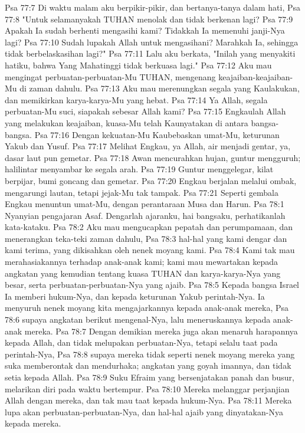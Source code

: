 Psa 77:7  Di waktu malam aku berpikir-pikir, dan bertanya-tanya dalam hati,
Psa 77:8  "Untuk selamanyakah TUHAN menolak dan tidak berkenan lagi?
Psa 77:9  Apakah Ia sudah berhenti mengasihi kami? Tidakkah Ia memenuhi janji-Nya lagi?
Psa 77:10  Sudah lupakah Allah untuk mengasihani? Marahkah Ia, sehingga tidak berbelaskasihan lagi?"
Psa 77:11  Lalu aku berkata, "Inilah yang menyakiti hatiku, bahwa Yang Mahatinggi tidak berkuasa lagi."
Psa 77:12  Aku mau mengingat perbuatan-perbuatan-Mu TUHAN, mengenang keajaiban-keajaiban-Mu di zaman dahulu.
Psa 77:13  Aku mau merenungkan segala yang Kaulakukan, dan memikirkan karya-karya-Mu yang hebat.
Psa 77:14  Ya Allah, segala perbuatan-Mu suci, siapakah sebesar Allah kami?
Psa 77:15  Engkaulah Allah yang melakukan keajaiban, kuasa-Mu telah Kaunyatakan di antara bangsa-bangsa.
Psa 77:16  Dengan kekuatan-Mu Kaubebaskan umat-Mu, keturunan Yakub dan Yusuf.
Psa 77:17  Melihat Engkau, ya Allah, air menjadi gentar, ya, dasar laut pun gemetar.
Psa 77:18  Awan mencurahkan hujan, guntur mengguruh; halilintar menyambar ke segala arah.
Psa 77:19  Guntur menggelegar, kilat berpijar, bumi goncang dan gemetar.
Psa 77:20  Engkau berjalan melalui ombak, mengarungi lautan, tetapi jejak-Mu tak tampak.
Psa 77:21  Seperti gembala Engkau menuntun umat-Mu, dengan perantaraan Musa dan Harun.
Psa 78:1  Nyanyian pengajaran Asaf. Dengarlah ajaranku, hai bangsaku, perhatikanlah kata-kataku.
Psa 78:2  Aku mau mengucapkan pepatah dan perumpamaan, dan menerangkan teka-teki zaman dahulu,
Psa 78:3  hal-hal yang kami dengar dan kami terima, yang dikisahkan oleh nenek moyang kami.
Psa 78:4  Kami tak mau merahasiakannya terhadap anak-anak kami; kami mau mewartakan kepada angkatan yang kemudian tentang kuasa TUHAN dan karya-karya-Nya yang besar, serta perbuatan-perbuatan-Nya yang ajaib.
Psa 78:5  Kepada bangsa Israel Ia memberi hukum-Nya, dan kepada keturunan Yakub perintah-Nya. Ia menyuruh nenek moyang kita mengajarkannya kepada anak-anak mereka,
Psa 78:6  supaya angkatan berikut mengenal-Nya, lalu meneruskannya kepada anak-anak mereka.
Psa 78:7  Dengan demikian mereka juga akan menaruh harapannya kepada Allah, dan tidak melupakan perbuatan-Nya, tetapi selalu taat pada perintah-Nya,
Psa 78:8  supaya mereka tidak seperti nenek moyang mereka yang suka memberontak dan mendurhaka; angkatan yang goyah imannya, dan tidak setia kepada Allah.
Psa 78:9  Suku Efraim yang bersenjatakan panah dan busur, melarikan diri pada waktu bertempur.
Psa 78:10  Mereka melanggar perjanjian Allah dengan mereka, dan tak mau taat kepada hukum-Nya.
Psa 78:11  Mereka lupa akan perbuatan-perbuatan-Nya, dan hal-hal ajaib yang dinyatakan-Nya kepada mereka.
